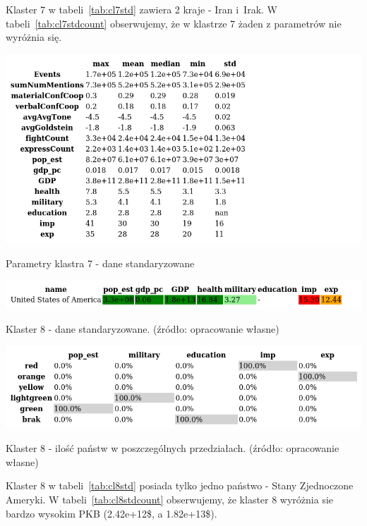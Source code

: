 \documentclass[11pt]{report}
\begin{document}
    Klaster 7 w tabeli~\ref{tab:cl7std} zawiera 2 kraje - Iran i~Irak.
    W tabeli~\ref{tab:cl7stdcount} obserwujemy, że w klastrze 7 żaden z parametrów nie wyróżnia się.

    \begin{table}[!htp]
        \centering
        \includegraphics[width=\linewidth]{tables/CLUST/desc/clust7std_desc.png}
        \caption{Parametry klastra 7 - dane standaryzowane}
        \label{tab:cl7std_desc}
    \end{table}

    \begin{table}[!htp]
        \centering
        \includegraphics[width=\linewidth]{tables/CLUST/cluster8stdkmeans.png}
        \caption{Klaster 8 - dane standaryzowane. (źródło: opracowanie własne)}
        \label{tab:cl8std}
    \end{table}

    \begin{table}[!htp]
        \centering
        \includegraphics[width=\linewidth]{tables/CLUST/cluster8stdkmeanscount.png}
        \caption{Klaster 8 - ilość państw w poszczególnych przedziałach. (źródło: opracowanie własne)}
        \label{tab:cl8stdcount}
    \end{table}

    Klaster 8 w tabeli~\ref{tab:cl8std} posiada tylko jedno państwo - Stany Zjednoczone Ameryki.
    W tabeli~\ref{tab:cl8stdcount} obserwujemy, że klaster 8 wyróżnia sie bardzo wysokim PKB (2.42e+12\$, a 1.82e+13\$).
\end{document}
